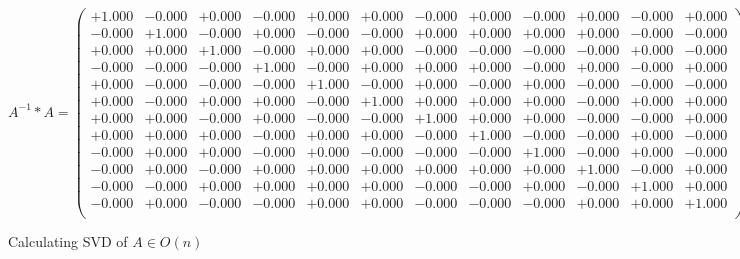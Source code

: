 \documentclass[9pt]{article}
\theoremstyle{plain}
\theoremstyle{definition}
\theoremstyle{remark}
\numberwithin{equation}{section}
\begin{document}
$A^{-1} *A = \left(
\begin{array}{
cccccccccccc}
+1.000 & -0.000 & +0.000 & -0.000 & +0.000 & +0.000 & -0.000 & +0.000 & -0.000 & +0.000 & -0.000 & +0.000 \\
-0.000 & +1.000 & -0.000 & +0.000 & -0.000 & -0.000 & +0.000 & +0.000 & +0.000 & +0.000 & -0.000 & -0.000 \\
+0.000 & +0.000 & +1.000 & -0.000 & +0.000 & +0.000 & -0.000 & -0.000 & -0.000 & -0.000 & +0.000 & -0.000 \\
-0.000 & -0.000 & -0.000 & +1.000 & -0.000 & +0.000 & +0.000 & +0.000 & -0.000 & +0.000 & -0.000 & +0.000 \\
+0.000 & -0.000 & -0.000 & -0.000 & +1.000 & -0.000 & +0.000 & -0.000 & +0.000 & -0.000 & -0.000 & -0.000 \\
+0.000 & -0.000 & +0.000 & +0.000 & -0.000 & +1.000 & +0.000 & +0.000 & +0.000 & -0.000 & +0.000 & +0.000 \\
+0.000 & +0.000 & -0.000 & +0.000 & -0.000 & -0.000 & +1.000 & +0.000 & +0.000 & -0.000 & -0.000 & +0.000 \\
+0.000 & +0.000 & +0.000 & -0.000 & +0.000 & +0.000 & -0.000 & +1.000 & -0.000 & -0.000 & +0.000 & -0.000 \\
-0.000 & +0.000 & +0.000 & -0.000 & +0.000 & -0.000 & -0.000 & -0.000 & +1.000 & -0.000 & +0.000 & -0.000 \\
-0.000 & +0.000 & -0.000 & +0.000 & +0.000 & +0.000 & +0.000 & +0.000 & +0.000 & +1.000 & -0.000 & +0.000 \\
-0.000 & -0.000 & +0.000 & +0.000 & +0.000 & +0.000 & -0.000 & -0.000 & +0.000 & -0.000 & +1.000 & +0.000 \\
-0.000 & +0.000 & -0.000 & -0.000 & +0.000 & +0.000 & -0.000 & -0.000 & -0.000 & +0.000 & +0.000 & +1.000 \\
\end{array}
\right)$ \newline 

Calculating SVD of  $A \in O(n)$
\end{document}
